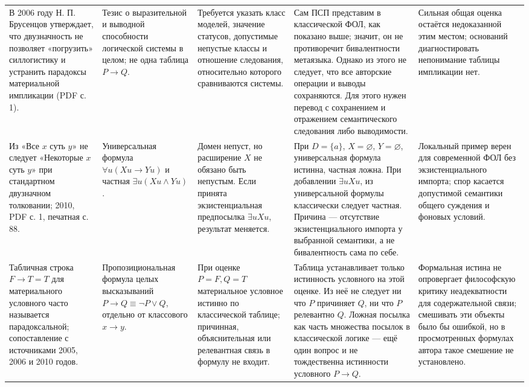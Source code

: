 \documentclass[12pt,a4paper]{article}
\begin{document}
{\begin{longtable}{P{0.18\textwidth}P{0.15\textwidth}P{0.25\textwidth}P{0.25\textwidth}P{0.11\textwidth}}
В 2006 году Н. П. Брусенцов утверждает, что двузначность не позволяет «погрузить» силлогистику и устранить парадоксы материальной импликации (PDF с. 1). & Тезис о выразительной и выводной способности логической системы в целом; не одна таблица \(P\to Q\). & Требуется указать класс моделей, значение статусов, допустимые непустые классы и отношение следования, относительно которого сравниваются системы. & Сам ПСП представим в классической ФОЛ, как показано выше; значит, он не противоречит бивалентности метаязыка. Однако из этого не следует, что все авторские операции и выводы сохраняются. Для этого нужен перевод с сохранением и отражением семантического следования либо выводимости. & Сильная общая оценка остаётся недоказанной этим местом; оснований диагностировать непонимание таблицы импликации нет. \\
Из «Все \(x\) суть \(y\)» не следует «Некоторые \(x\) суть \(y\)» при стандартном двузначном толковании; 2010, PDF с. 1, печатная с. 88. & Универсальная формула \(\forall u(Xu\to Yu)\) и частная \(\exists u(Xu\land Yu)\). & Домен непуст, но расширение \(X\) не обязано быть непустым. Если принята экзистенциальная предпосылка \(\exists uXu\), результат меняется. & При \(D=\{a\}\), \(X=\varnothing\), \(Y=\varnothing\), универсальная формула истинна, частная ложна. При добавлении \(\exists uXu\), из универсальной формулы классически следует частная. Причина — отсутствие экзистенциального импорта у выбранной семантики, а не бивалентность сама по себе. & Локальный пример верен для современной ФОЛ без экзистенциального импорта; спор касается допустимой семантики общего суждения и фоновых условий. \\
Табличная строка \(F\to T=T\) для материального условного часто называется парадоксальной; сопоставление с источниками 2005, 2006 и 2010 годов. & Пропозициональная формула целых высказываний \(P\to Q\equiv\neg P\lor Q\), отдельно от классового \(x\to y\). & При оценке \(P=F,Q=T\) материальное условное истинно по классической таблице; причинная, объяснительная или релевантная связь в формулу не входит. & Таблица устанавливает только истинность условного на этой оценке. Из неё не следует ни что \(P\) причиняет \(Q\), ни что \(P\) релевантно \(Q\). Ложная посылка как часть множества посылок в классической логике — ещё один вопрос и не тождественна истинности условного \(P\to Q\). & Формальная истина не опровергает философскую критику неадекватности для содержательной связи; смешивать эти объекты было бы ошибкой, но в просмотренных формулах автора такое смешение не установлено. \\
\bottomrule
\end{longtable}
}
\end{document}
